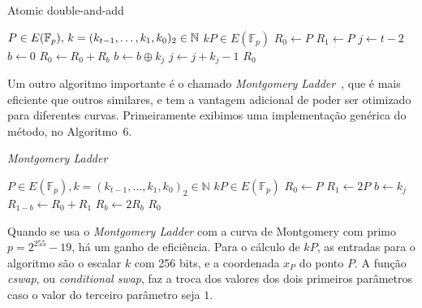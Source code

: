 \documentclass{SBCbookchapter}
\begin{document}
\begin{algorithm}[H]
\caption{Atomic double-and-add}
\begin{algorithmic}[1]
    \REQUIRE $P \in E(\mathbb{F}_p),\, k=(k_{t-1},\ldots,k_1,k_0)_{2} \in \mbox{${\mathbb N}$}$
    \ENSURE $kP \in E(\mathbb{F}_p)$
    \STATE $R_0 \leftarrow P$
    \STATE $R_1 \leftarrow P$
    \STATE $j \leftarrow t - 2$
    \STATE $b \leftarrow 0$
        \STATE $R_0 \leftarrow R_0 + R_b$
        \STATE $b \leftarrow b \oplus k_j$
        \STATE $j \leftarrow j + k_j -1$
    \ENDWHILE
    \RETURN $R_0$
    \end{algorithmic}
\end{algorithm}

Um outro algoritmo importante é o chamado \textit{Montgomery Ladder}~\cite{Dull:2015:HCM:2834659.2834708}, que é mais eficiente que outros similares, e tem a vantagem adicional de poder ser otimizado para diferentes curvas. Primeiramente exibimos uma implementação genérica do método, no Algoritmo~6.

\begin{algorithm}[H]
\caption{\emph{Montgomery Ladder}}
\begin{algorithmic}[1]
    \REQUIRE $P \in E(\mathbb{F}_p), k=(k_{t-1},\ldots,k_1,k_0)_2 \in \mathbb{N}$
    \ENSURE $kP \in E(\mathbb{F}_p)$
    \STATE $R_0 \leftarrow P$
    \STATE $R_1 \leftarrow 2P$
        \STATE $b \leftarrow k_j$
        \STATE $R_{1-b} \leftarrow R_0 + R_1$
        \STATE $R_b \leftarrow 2R_b$
    \ENDFOR
    \RETURN $R_0$
    \end{algorithmic}
\end{algorithm}

Quando se usa o \textit{Montgomery Ladder} com a curva de Montgomery com primo $p=2^{255}-19$, há um ganho de eficiência. Para o cálculo de $kP$, as entradas para o algoritmo são o escalar $k$ com 256 bits, e a coordenada $x_P$ do ponto $P$. A função \textit{cswap}, ou \textit{conditional swap}, faz a troca dos valores dos dois primeiros parâmetros caso o valor do terceiro parâmetro seja $1$.

\end{document}
